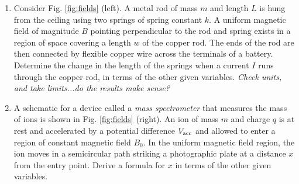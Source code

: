 \documentclass{article}
\begin{document}
\begin{enumerate}
\item Consider Fig. \ref{fig:fields} (left). A metal rod of mass $m$ and length $L$ is hung from the ceiling using two springs of spring constant $k$. A uniform magnetic field of magnitude $B$ pointing perpendicular to the rod and spring exists in a region of space covering a length $w$ of the copper rod. The ends of the rod are then connected by flexible copper wire across the terminals of a battery. Determine the change in the length of the springs when a current $I$ runs through the copper rod, in terms of the other given variables. \textit{Check units, and take limits...do the results make sense?} \\ \vspace{2.5cm}
\item A schematic for a device called a \textit{mass spectrometer} that measures the mass of ions is shown in Fig. \ref{fig:fields} (right). An ion of mass $m$ and charge $q$ is at rest and accelerated by a potential difference $V_{\rm acc}$ and allowed to enter a region of constant magnetic field $B_0$.  In the uniform magnetic field region, the ion moves in a semicircular path striking a photographic plate at a distance $x$ from the entry point.  Derive a formula for $x$ in terms of the other given variables.
\end{enumerate}
\end{document}
